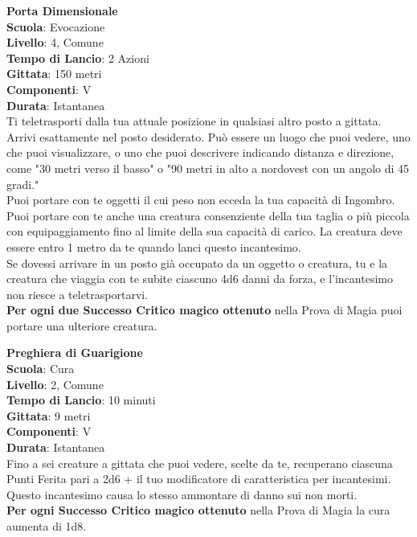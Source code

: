 \begin{multicols}{2}
\medskip\textbf{Porta Dimensionale}\\
\textbf{Scuola}: Evocazione\\
\textbf{Livello}: 4, Comune\\
\textbf{Tempo di Lancio}: 2 Azioni\\
\textbf{Gittata}: 150 metri\\
\textbf{Componenti}: V\\
\textbf{Durata}: Istantanea\\
Ti teletrasporti dalla tua attuale posizione in qualsiasi altro posto a gittata. Arrivi esattamente nel posto desiderato. Può essere un luogo che puoi vedere, uno che puoi visualizzare, o uno che puoi descrivere indicando distanza e direzione, come "30 metri verso il basso" o "90 metri in alto a nordovest con un angolo di 45 gradi."\\
Puoi portare con te oggetti il cui peso non ecceda la tua capacità di Ingombro. Puoi portare con te anche una creatura consenziente della tua taglia o più piccola con equipaggiamento fino al limite della sua capacità di carico. La creatura deve essere entro 1 metro da te quando lanci questo incantesimo. \\
Se dovessi arrivare in un posto già occupato da un oggetto o creatura, tu e la creatura che viaggia con te subite ciascuno 4d6 danni da forza, e l'incantesimo non riesce a teletrasportarvi.\\
\textbf{Per ogni due Successo Critico magico ottenuto} nella Prova di Magia puoi portare una ulteriore creatura.

\medskip\textbf{Preghiera di Guarigione}\\
\textbf{Scuola}: Cura\\
\textbf{Livello}: 2, Comune\\
\textbf{Tempo di Lancio}: 10 minuti\\
\textbf{Gittata}: 9 metri\\
\textbf{Componenti}: V\\
\textbf{Durata}: Istantanea\\
Fino a sei creature a gittata che puoi vedere, scelte da te, recuperano ciascuna Punti Ferita pari a 2d6 + il tuo modificatore di caratteristica per incantesimi. Questo incantesimo causa lo stesso ammontare di danno sui non morti.\\
\textbf{Per ogni Successo Critico magico ottenuto} nella Prova di Magia la cura aumenta di 1d8.


\end{multicols}
